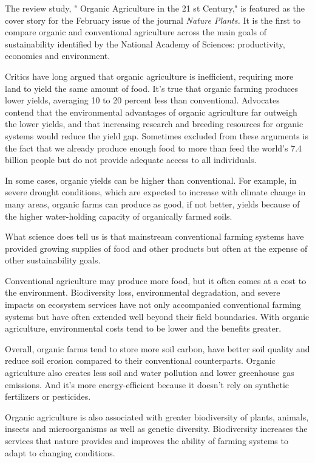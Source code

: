 \documentclass[UTF8,11pt]{ctexart}
\begin{document}
The review study, " Organic Agriculture in the 21 st Century," is featured as the cover story for the February issue of the journal \textit{Nature Plants. }It is the first to compare organic and conventional agriculture across the main goals of sustainability identified by the National Academy of Sciences: productivity, economics and environment.


Critics have long argued that organic agriculture is inefficient, requiring more land to yield the same amount of food. It's true that organic farming produces lower yields, averaging 10 to 20 percent less than conventional. Advocates contend that the environmental advantages of organic agriculture far outweigh the lower yields, and that increasing research and breeding resources for organic systems would reduce the yield gap. Sometimes excluded from these arguments is the fact that we already produce enough food to more than feed the world's 7.4 billion people but do not provide adequate access to all individuals.


In some cases, organic yields can be higher than conventional. For example, in severe drought conditions, which are expected to increase with climate change in many areas, organic farms can produce as good, if not better, yields because of the higher water-holding capacity of organically farmed soils.


What science does tell us is that mainstream conventional farming systems have provided growing supplies of food and other products but often at the expense of other sustainability goals.


Conventional agriculture may produce more food, but it often comes at a cost to the environment. Biodiversity loss, environmental degradation, and severe impacts on ecosystem services have not only accompanied conventional farming systems but have often extended well beyond their field boundaries. With organic agriculture, environmental costs tend to be lower and the benefits greater.


Overall, organic farms tend to store more soil carbon, have better soil quality and reduce soil erosion compared to their conventional counterparts. Organic agriculture also creates less soil and water pollution and lower greenhouse gas emissions. And it's more energy-efficient because it doesn't rely on synthetic fertilizers or pesticides.


Organic agriculture is also associated with greater biodiversity of plants, animals, insects and microorganisms as well as genetic diversity. Biodiversity increases the services that nature provides and improves the ability of farming systems to adapt to changing conditions.
\end{document}
